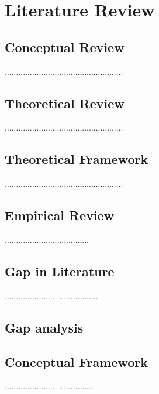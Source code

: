 \section{Literature Review} %

\subsection{Conceptual Review}
....................................................
\subsection{Theoretical Review}
....................................................
\subsection{Theoretical Framework}
....................................................
\subsection{Empirical Review}
.....................................
\subsection{Gap in Literature}
..........................................
\subsection{Gap analysis}

\subsection{Conceptual Framework}
.......................................